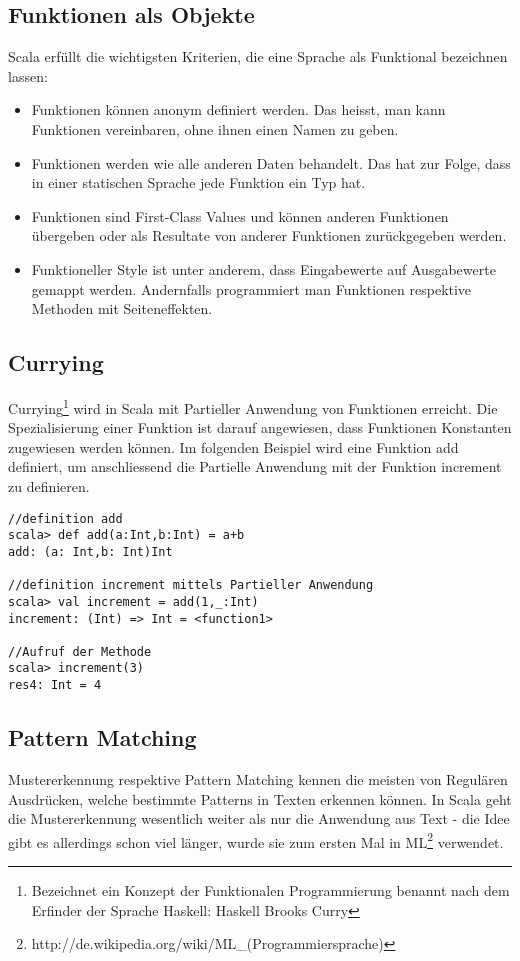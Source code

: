 \subsection{Funktionen als Objekte}
Scala erf\"ullt die wichtigsten Kriterien, die eine Sprache als Funktional bezeichnen lassen\cite[p. 28]{Piepmeyer201006}:
\begin{itemize}
\item Funktionen k\"onnen anonym definiert werden. Das heisst, man kann Funktionen vereinbaren, ohne ihnen einen Namen zu geben. 
\item Funktionen werden wie alle anderen Daten behandelt. Das hat zur Folge, dass in einer statischen Sprache jede Funktion ein Typ hat. 
\item Funktionen sind First-Class Values und k\"onnen anderen Funktionen \"ubergeben oder als Resultate von anderer Funktionen zur\"uckgegeben werden.
\item Funktioneller Style ist unter anderem, dass Eingabewerte auf Ausgabewerte gemappt werden. Andernfalls programmiert man Funktionen respektive Methoden mit Seiteneffekten.
\end{itemize}
\subsection{Currying}
Currying\footnote{Bezeichnet ein Konzept der Funktionalen Programmierung benannt nach dem Erfinder der Sprache Haskell:  Haskell Brooks Curry} wird in Scala mit Partieller Anwendung von Funktionen erreicht. Die Spezialisierung einer Funktion ist darauf angewiesen, dass Funktionen Konstanten zugewiesen werden k\"onnen. Im folgenden Beispiel wird eine Funktion add definiert, um anschliessend die Partielle Anwendung mit der Funktion increment zu definieren.

\begin{lstlisting}[caption=Partielle Anwendung einer Funktion]
//definition add
scala> def add(a:Int,b:Int) = a+b
add: (a: Int,b: Int)Int

//definition increment mittels Partieller Anwendung
scala> val increment = add(1,_:Int)
increment: (Int) => Int = <function1>

//Aufruf der Methode
scala> increment(3)
res4: Int = 4
\end{lstlisting}


\subsection{Pattern Matching}
Mustererkennung respektive Pattern Matching kennen die meisten von Regul\"aren Ausdr\"ucken, welche bestimmte Patterns in Texten erkennen k\"onnen. In Scala geht die Mustererkennung wesentlich weiter als nur die Anwendung aus Text - die Idee gibt es allerdings schon viel l\"anger, wurde sie zum ersten Mal in ML\footnote{http://de.wikipedia.org/wiki/ML\_(Programmiersprache)} verwendet.


